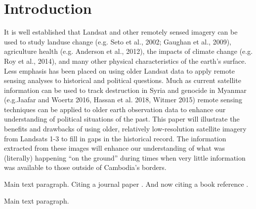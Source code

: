\section{Introduction}
It is well established that Landsat and other remotely sensed imagery can be used to study landuse change (e.g. Seto et al., 2002; Gaughan et al., 2009), agriculture health (e.g. Anderson et al., 2012), the impacts of climate change (e.g. Roy et al., 2014), and many other physical characteristics of the earth's surface.  
Less emphasis has been placed on using older Landsat data to apply remote sensing analyses to historical and political questions. Much as current satellite information can be used to track destruction in Syria and genocide in Myanmar (e.g.Jaafar and Woertz 2016, Hassan et al. 2018, Witmer 2015) remote sensing techniques can be applied to older earth observation data to enhance our understanding of political situations of the past.  This paper will illustrate the benefits and drawbacks of using older, relatively low-resolution satellite imagery from Landsats 1-3 to fill in gaps in the historical record.
The information extracted from these images will enhance our understanding of what was (literally) happening “on the ground” during times when very little information was available to those outside of Cambodia’s borders.


Main text paragraph. Citing a journal paper \cite{ref-journal}. And now citing a book reference \cite{ref-book}.


Main text paragraph.
